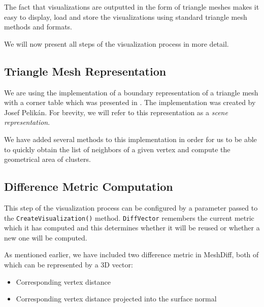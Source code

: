 The fact that visualizations are outputted in the form of triangle meshes makes it easy to display, load and store the visualizations using standard triangle mesh methods and formats.

We will now present all steps of the visualization process in more detail.

\subsection{Triangle Mesh Representation}
\label{sec:mesh_representation}

We are using the implementation of a boundary representation of a triangle mesh with a corner table which was presented in \citet{Corner03}. The implementation was created by Josef Pelikán. For brevity, we will refer to this representation as a {\it scene representation}\footnotemark.


We have added several methods to this implementation in order for us to be able to quickly obtain the list of neighbors of a given vertex and compute the geometrical area of clusters.

\subsection{Difference Metric Computation}
\label{sec:analysis_metric}

This step of the visualization process can be configured by a parameter passed to the \verb+CreateVisualization()+ method. \verb+DiffVector+ remembers the current metric which it has computed and this determines whether it will be reused or whether a new one will be computed.

As mentioned earlier, we have included two difference metric in MeshDiff, both of which can be represented by a 3D vector:

\begin{itemize}
\item Corresponding vertex distance
\item Corresponding vertex distance projected into the surface normal
\end{itemize}

